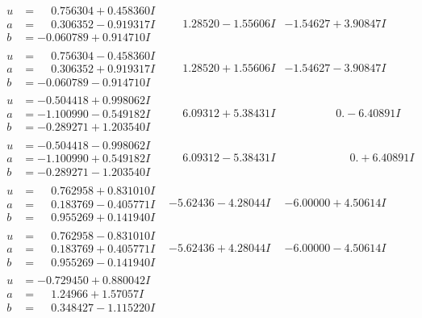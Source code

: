 \documentclass[1p]{elsarticle_modified}
\theoremstyle{definition}
\begin{document}
$$\begin{array}{c|c|c}
\begin{aligned}
u &= \phantom{-}0.756304 + 0.458360 I \\
a &= \phantom{-}0.306352 - 0.919317 I \\
b &= -0.060789 + 0.914710 I\end{aligned}
 & \phantom{-}1.28520 - 1.55606 I & -1.54627 + 3.90847 I \\ \hline\begin{aligned}
u &= \phantom{-}0.756304 - 0.458360 I \\
a &= \phantom{-}0.306352 + 0.919317 I \\
b &= -0.060789 - 0.914710 I\end{aligned}
 & \phantom{-}1.28520 + 1.55606 I & -1.54627 - 3.90847 I \\ \hline\begin{aligned}
u &= -0.504418 + 0.998062 I \\
a &= -1.100990 - 0.549182 I \\
b &= -0.289271 + 1.203540 I\end{aligned}
 & \phantom{-}6.09312 + 5.38431 I & \phantom{-0.000000 } 0. - 6.40891 I \\ \hline\begin{aligned}
u &= -0.504418 - 0.998062 I \\
a &= -1.100990 + 0.549182 I \\
b &= -0.289271 - 1.203540 I\end{aligned}
 & \phantom{-}6.09312 - 5.38431 I & \phantom{-0.000000 -}0. + 6.40891 I \\ \hline\begin{aligned}
u &= \phantom{-}0.762958 + 0.831010 I \\
a &= \phantom{-}0.183769 - 0.405771 I \\
b &= \phantom{-}0.955269 + 0.141940 I\end{aligned}
 & -5.62436 - 4.28044 I & -6.00000 + 4.50614 I \\ \hline\begin{aligned}
u &= \phantom{-}0.762958 - 0.831010 I \\
a &= \phantom{-}0.183769 + 0.405771 I \\
b &= \phantom{-}0.955269 - 0.141940 I\end{aligned}
 & -5.62436 + 4.28044 I & -6.00000 - 4.50614 I \\ \hline\begin{aligned}
u &= -0.729450 + 0.880042 I \\
a &= \phantom{-}1.24966 + 1.57057 I \\
b &= \phantom{-}0.348427 - 1.115220 I\end{aligned}

\end{array}$$
\end{document}

